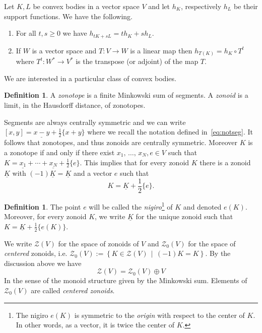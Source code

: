 \documentclass[10pt]{amsart}
\theoremstyle{definition}\newtheorem{defi}[theo]{Definition}\newtheorem{rema}[theo]{Remark}\newtheorem{exam}[theo]{Example}\newtheorem{exem}[theo]{Example}\newtheorem{nota}[theo]{Notation}
\newcommand{\ZZ}{\mathscr{Z}}
\newcommand{\ZZo}{\mathscr{Z}_0}
\newcommand{\set}[2]{\left\{ #1 \, \middle| \, #2\right\}}
\newcommand{\seg}{\underline}
\begin{document}
\begin{prop}\label{prop:suppfctprop}
Let $K, L$ be convex bodies in a vector space $V$ and let $h_K$, respectively $h_L$ be their support functions. We have the following.
\begin{enumerate}
\item\label{prop3.1.1} For all $t,s\geq0$ we have $h_{tK+sL}=th_K+sh_L$.
\item \label{itm:linh}
If $W$ is a vector space and $T:V\to W$ is a linear map then $h_{T(K)}=h_K\circ T^t$ where $T^t:W^*\to V^*$ is the transpose (or adjoint) of the map $T$.
\end{enumerate}
\end{prop}

We are interested in a particular class of convex bodies.

\begin{defi}
A \emph{zonotope} is a finite Minkowski sum of segments. A \emph{zonoid} is a limit, in the Hausdorff distance, of zonotopes.
\end{defi}

Segments are always centrally symmetric and we can write $[x,y]=\seg{x-y}+\tfrac{1}{2}\{x+y\}$ where we recall the notation defined in~\eqref{eq:notseg}. It follows that zonotopes, and thus zonoids are centrally symmetric. Moreover $K$ is a zonotope if and only if there exist $x_1,\,\ldots,\,x_N,e\in V$ such that $K=\seg{x_1}+\cdots+\seg{x_N}+\tfrac{1}{2}\{e\}$. This implies that for every zonoid $K$ there is a zonoid $\seg{K}$ with $(-1)\seg{K}=\seg{K}$ and a vector $e$ such that
\begin{equation*}
K=\seg{K}+\frac{1}{2}\{e\}.
\end{equation*}

\begin{defi}\label{def:nigiro}
The point $e$ will be called the \emph{nigiro}\footnote{The nigiro $e(K)$ is symmetric to the \emph{origin} with respect to the center of $K$. In other words, as a vector, it is twice the center of $K$.} of $K$ and denoted $e(K)$. Moreover, for every zonoid $K$, we write $\seg{K}$ for the unique zonoid such that $K=\seg{K}+\tfrac{1}{2}\{e(K)\}.$
\end{defi}

We write $\ZZ(V)$ for the space of zonoids of $V$ and $\ZZo(V)$ for the space of \emph{centered} zonoids, i.e. $\ZZo(V):=\set{K\in \ZZ(V)}{(-1)K=K}$. By the discussion above we have
\begin{equation*}
\ZZ(V)=\ZZo(V)\oplus V
\end{equation*}
In the sense of the monoid structure given by the Minkowski sum. Elements of $\ZZo(V)$ are called \emph{centered zonoids}.
\end{document}

